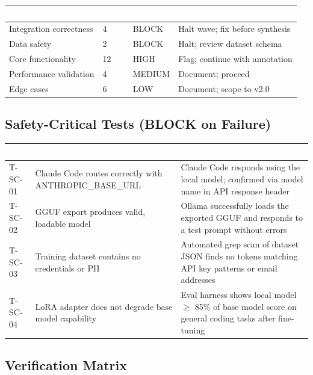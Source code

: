 \documentclass[11pt,letterpaper]{article}
\newcommand{\tableheader}[1]{\textbf{\sffamily\textcolor{white}{#1}}}
\begin{document}
\begin{center}
\begin{tabularx}{\textwidth}{L{3.5cm}C{1.5cm}L{2cm}X}
\toprule
{}
\tableheader{Category} & \tableheader{Tests} & \tableheader{Priority} & \tableheader{Fail Action} \\
\midrule
Integration correctness & 4 & BLOCK & Halt wave; fix before synthesis \\
Data safety & 2 & BLOCK & Halt; review dataset schema \\
Core functionality & 12 & HIGH & Flag; continue with annotation \\
Performance validation & 4 & MEDIUM & Document; proceed \\
Edge cases & 6 & LOW & Document; scope to v2.0 \\
\bottomrule
\end{tabularx}
\end{center}

\subsection{Safety-Critical Tests (BLOCK on Failure)}

\begin{center}
\begin{tabularx}{\textwidth}{L{1.5cm}L{4cm}X}
\toprule
{}
\tableheader{ID} & \tableheader{Verifies} & \tableheader{Expected Result} \\
\midrule
T-SC-01 & Claude Code routes correctly with ANTHROPIC\_BASE\_URL & Claude Code responds using the local model; confirmed via model name in API response header \\
T-SC-02 & GGUF export produces valid, loadable model & Ollama successfully loads the exported GGUF and responds to a test prompt without errors \\
T-SC-03 & Training dataset contains no credentials or PII & Automated grep scan of dataset JSON finds no tokens matching API key patterns or email addresses \\
T-SC-04 & LoRA adapter does not degrade base model capability & Eval harness shows local model $\geq$ 85\% of base model score on general coding tasks after fine-tuning \\
\bottomrule
\end{tabularx}
\end{center}

\subsection{Verification Matrix}
\end{document}
